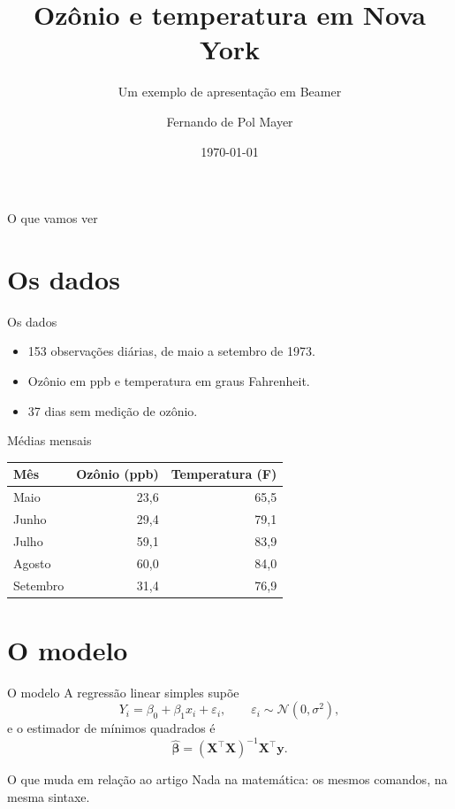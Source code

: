 \documentclass[aspectratio=169]{beamer}
\title{Ozônio e temperatura em Nova York}
\subtitle{Um exemplo de apresentação em Beamer}
\author{Fernando de Pol Mayer}
\institute{DEST/UFPR}
\date{\today}
\begin{document}
\frame{\titlepage}

\begin{frame}{O que vamos ver}
  \tableofcontents
\end{frame}

\section{Os dados}

\begin{frame}{Os dados}
  \begin{itemize}
    \item<1-> 153 observações diárias, de maio a setembro de 1973.
    \item<2-> Ozônio em ppb e temperatura em graus Fahrenheit.
    \item<3-> 37 dias sem medição de ozônio.
  \end{itemize}

  \vspace{0.5cm}
\end{frame}

\begin{frame}{Médias mensais}
  \begin{table}
    \centering
    \begin{tabular}{lrr}
      \toprule
      Mês      & Ozônio (ppb) & Temperatura (F) \\
      \midrule
      Maio     & 23,6 & 65,5 \\
      Junho    & 29,4 & 79,1 \\
      Julho    & 59,1 & 83,9 \\
      Agosto   & 60,0 & 84,0 \\
      Setembro & 31,4 & 76,9 \\
      \bottomrule
    \end{tabular}
  \end{table}
\end{frame}

\section{O modelo}

\begin{frame}{O modelo}
  A regressão linear simples supõe
  \[
    Y_i = \beta_0 + \beta_1 x_i + \varepsilon_i,
    \qquad \varepsilon_i \sim \mathcal{N}(0, \sigma^2),
  \]
  e o estimador de mínimos quadrados é
  \[
    \hat{\boldsymbol{\beta}} =
    (\mathbf{X}^{\top}\mathbf{X})^{-1}\mathbf{X}^{\top}\mathbf{y}.
  \]

  \begin{block}{O que muda em relação ao artigo}
    Nada na matemática: os mesmos comandos, na mesma sintaxe.
  \end{block}
\end{frame}
\end{document}
